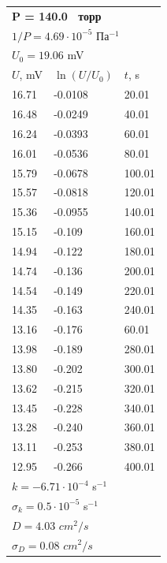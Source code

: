 \documentclass[a4paper,12pt]{article}
\begin{document}
\begin{center}
\begin{tabular}{||l|l|l||}
			
			
			
			\multicolumn{3}{||l||}{\textbf{P = 140.0  торр}} \\ 
			\multicolumn{3}{||l||}{$1 / P = 4.69 \cdot 10^{-5}$ $Па^{-1}$} \\ \hline
			\multicolumn{3}{||l||}{$U_0 = 19.06$ mV} \\ \hline
			$U$, mV&$\ln (U/U_0)$ & $t$, s \\ \hline
			16.71 & -0.0108  &20.01 \\ \hline
			16.48 &  -0.0249 &40.01 \\ \hline
			16.24 & -0.0393&60.01  \\ \hline
			16.01 & -0.0536 &80.01  \\ \hline
			15.79 & -0.0678&100.01  \\ \hline
			15.57  & -0.0818&120.01  \\ \hline
			15.36& 	-0.0955&140.01  \\ \hline
			15.15& -0.109&160.01  \\ \hline
			14.94& -0.122 &180.01  \\ \hline
			14.74& -0.136 &200.01  \\ \hline
			14.54& -0.149  &220.01  \\ \hline
			14.35& -0.163 &240.01 \\ \hline
			13.16& -0.176 &60.01\\ \hline
			13.98& -0.189 &280.01  \\ \hline
			13.80& -0.202  &300.01  \\ \hline
			13.62&-0.215& 320.01  \\ \hline
			13.45& -0.228&340.01  \\ \hline
			13.28&-0.240& 360.01  \\ \hline
			13.11& 	-0.253 &380.01  \\ \hline
			12.95& -0.266&400.01  \\ \hline
			\multicolumn{3}{||l||}{$k = -6.71\cdot 10^{-4}$ s$^{-1}$} \\ 
			\multicolumn{3}{||l||}{$\sigma_k =0.5 \cdot 10^{-5}$ s$^{-1}$} \\ \hline 
			\multicolumn{3}{||l||}{$D = 4.03$ $cm^2/s$}\\ 
			\multicolumn{3}{||l||}{$\sigma_D =0.08$ $cm^2/s$} \\ \hline 
		\end{tabular}
		
		
		
		
	\end{center}
	
\end{document}

